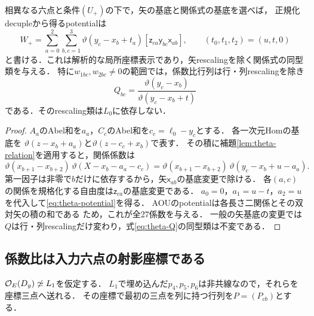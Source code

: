 \begin{theorem}[正規化decupleの全potential]\label{thm:theta-potential}
相異なる六点と条件$(U_+)$の下で，矢の基底と関係式の基底を選べば，
正規化decupleから得るpotentialは
\begin{equation}\label{eq:theta-potential}
 W_+=\sum_{a=0}^2\sum_{b,c=1}^3
 \vartheta(y_c-x_b+t_a)
 [\mathsf z_{ca}\mathsf y_{bc}\mathsf x_{ab}],
 \qquad(t_0,t_1,t_2)=(u,t,0)
\end{equation}
と書ける．これは解析的な局所座標表示であり，矢rescalingを除く関係式の同型類を与える．
特に$w_{1bc},w_{2bc}\ne0$の範囲では，係数比行列は行・列rescalingを除き
\begin{equation}\label{eq:theta-Q}
 Q_{bc}=\frac{\vartheta(y_c-x_b)}{\vartheta(y_c-x_b+t)}
\end{equation}
である．そのrescaling類は$L_0$に依存しない．
\end{theorem}
\begin{proof}
$A_a$のAbel和を$a_a$，$C_c$のAbel和を$c_c=\ell_0-y_c$とする．
各一次元Homの基底を
$\vartheta(z-x_b+a_a)$と$\vartheta(z-c_c+x_b)$で表す．
その積に補題\ref{lem:theta-relation}を適用すると，関係係数は
\[
 \vartheta(x_{b+1}-x_{b+2})\,
 \vartheta(X-x_b-a_a-c_c)
 =\vartheta(x_{b+1}-x_{b+2})\,
   \vartheta(y_c-x_b+u-a_a).
\]
第一因子は非零で$b$だけに依存するから，矢$\mathsf x_{ab}$の基底変更で除ける．
各$(a,c)$の関係を規格化する自由度は$\mathsf z_{ca}$の基底変更である．
$a_0=0$，$a_1=u-t$，$a_2=u$を代入して\eqref{eq:theta-potential}を得る．
AOUのpotentialは各長さ二関係とその双対矢の積の和である
\cite[(4.7), \S7]{AOU}ため，これが全27係数を与える．
一般の矢基底の変更では$Q$は行・列rescalingだけ変わり，式\eqref{eq:theta-Q}の同型類は不変である．
\end{proof}

\subsection{係数比は入力六点の射影座標である}
$\mathcal O_E(D_y)\not\simeq L_1$を仮定する．
$L_1$で埋め込んだ$p_4,p_5,p_6$は非共線なので，それらを座標三点へ送れる．
その座標で最初の三点を列に持つ行列を$P=(P_{cb})$とする．

